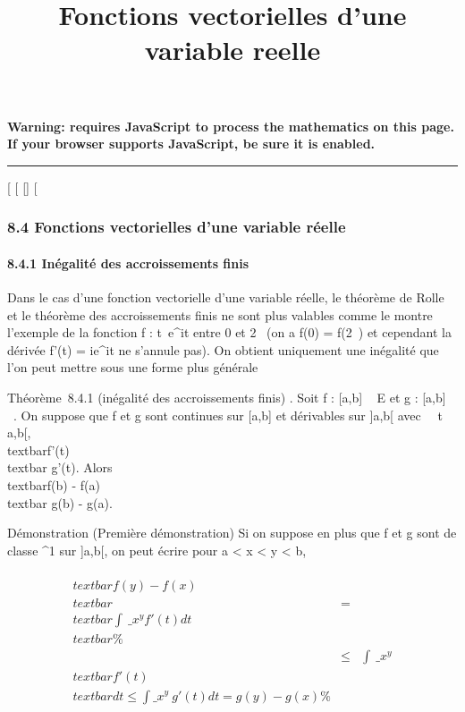 \documentclass[]{article}
\title{Fonctions vectorielles d'une variable reelle}
\author{}
\date{}
\begin{document}
\maketitle

\textbf{Warning: 
requires JavaScript to process the mathematics on this page.\\ If your
browser supports JavaScript, be sure it is enabled.}

\begin{center}\rule{3in}{0.4pt}\end{center}

{[}
{[}
{[}{]}
{[}

\subsubsection{8.4 Fonctions vectorielles d'une variable réelle}

\paragraph{8.4.1 Inégalité des accroissements finis}

Dans le cas d'une fonction vectorielle d'une variable réelle, le
théorème de Rolle et le théorème des accroissements finis ne sont plus
valables comme le montre l'exemple de la fonction f :
t\mapsto~e^it entre 0 et 2\pi~ (on a f(0) =
f(2\pi~) et cependant la dérivée f'(t) = ie^it ne s'annule pas).
On obtient uniquement une inégalité que l'on peut mettre sous une forme
plus générale

Théorème~8.4.1 (inégalité des accroissements finis) . Soit f : {[}a,b{]}
\rightarrow~ E et g : {[}a,b{]} \rightarrow~ ~. On suppose que f et g sont continues sur
{[}a,b{]} et dérivables sur {]}a,b{[} avec \forall~~t
\in{]}a,b{[}, \\textbar{}f'(t)\\textbar{} \leq
g'(t). Alors \\textbar{}f(b) -
f(a)\\textbar{} \leq g(b) - g(a).

Démonstration (Première démonstration) Si on suppose en plus que f et g
sont de classe ^1 sur {]}a,b{[}, on peut écrire pour a
\textless{} x \textless{} y \textless{} b,

\begin{align*} \\textbar{}f(y) -
f(x)\\textbar{}& =&
\\textbar{}\int ~
\_x^yf'(t) dt\\textbar{} \%&
\\ & \leq& \int ~
\_x^y\\textbar{}f'(t)\\textbar{}
dt \leq\int  \_x^y~g'(t) dt = g(y) -
g(x)\%& \\
\end{align*}
\end{document}
